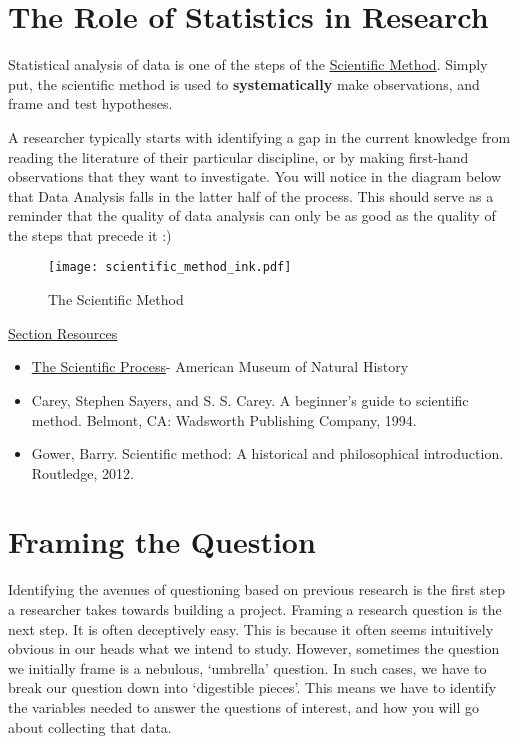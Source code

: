 \documentclass{article}
\begin{document}
\newpage
\section{The Role of Statistics in Research}

Statistical analysis of data is one of the steps of the \href{https://www.amnh.org/explore/videos/the-scientific-process}{Scientific Method}.
Simply put, the scientific method is used to \textbf{systematically} make observations, and frame and test hypotheses. 

A researcher typically starts with identifying a gap in the current knowledge from reading the literature of their particular discipline, or by making first-hand observations that they want to investigate. You will notice in the diagram below that Data Analysis falls in the latter half of the process. This should serve as a reminder that the quality of data analysis can only be as good as the quality of the steps that precede it :) 

\begin{figure}[hbt!] %
    \texttt{[image: scientific\_method\_ink.pdf]}
    \caption{\label{fig:scientific_method_cycle} The Scientific Method}
\end{figure}

\underline{Section Resources}
\begin{itemize}
    \item \href{https://www.amnh.org/explore/videos/the-scientific-process}{The Scientific Process}- American Museum of Natural History
    \item Carey, Stephen Sayers, and S. S. Carey. A beginner's guide to scientific method. Belmont, CA: Wadsworth Publishing Company, 1994.
    \item Gower, Barry. Scientific method: A historical and philosophical introduction. Routledge, 2012.
\end{itemize}

\newpage
\section{Framing the Question}

Identifying the avenues of questioning based on previous research is the first step a researcher takes towards building a project. Framing a research question is the next step. It is often deceptively easy. This is because it often seems intuitively obvious in our heads what we intend to study. However, sometimes the question we initially frame is a nebulous, ‘umbrella’ question. In such cases, we have to break our question down into ‘digestible pieces’. This means we have to identify the variables needed to answer the questions of interest, and how you will go about collecting that data.
\end{document}

